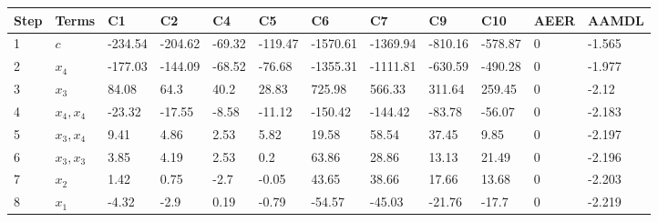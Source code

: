 \begin{tabular}{llllllllllll}
Step & Terms & C1 & C2 & C4 & C5 & C6 & C7 & C9 & C10 & AEER & AAMDL \\ 
\hline 
1 & $c$ & -234.54 & -204.62 & -69.32 & -119.47 & -1570.61 & -1369.94 & -810.16 & -578.87 & 0 & -1.565 \\ 
2 & $x_4$ & -177.03 & -144.09 & -68.52 & -76.68 & -1355.31 & -1111.81 & -630.59 & -490.28 & 0 & -1.977 \\ 
3 & $x_3$ & 84.08 & 64.3 & 40.2 & 28.83 & 725.98 & 566.33 & 311.64 & 259.45 & 0 & -2.12 \\ 
4 & $x_4,x_4$ & -23.32 & -17.55 & -8.58 & -11.12 & -150.42 & -144.42 & -83.78 & -56.07 & 0 & -2.183 \\ 
5 & $x_3,x_4$ & 9.41 & 4.86 & 2.53 & 5.82 & 19.58 & 58.54 & 37.45 & 9.85 & 0 & -2.197 \\ 
6 & $x_3,x_3$ & 3.85 & 4.19 & 2.53 & 0.2 & 63.86 & 28.86 & 13.13 & 21.49 & 0 & -2.196 \\ 
7 & $x_2$ & 1.42 & 0.75 & -2.7 & -0.05 & 43.65 & 38.66 & 17.66 & 13.68 & 0 & -2.203 \\ 
8 & $x_1$ & -4.32 & -2.9 & 0.19 & -0.79 & -54.57 & -45.03 & -21.76 & -17.7 & 0 & -2.219 \\ 
\hline 
\end{tabular}